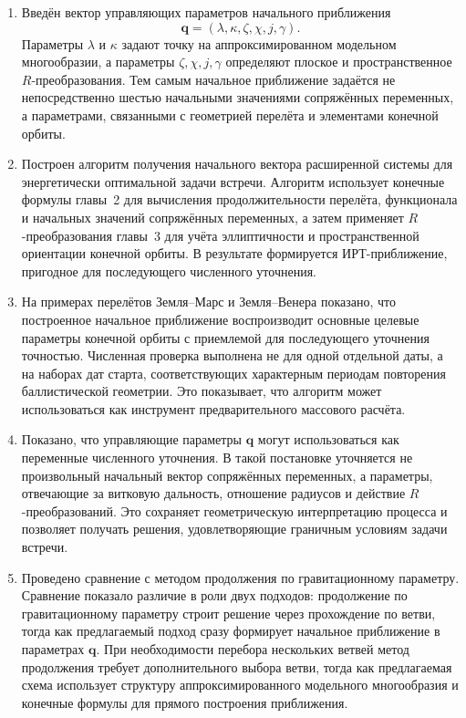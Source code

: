 \begin{enumerate}
	\item Введён вектор управляющих параметров начального приближения
	\begin{equation}
	\mathbf q=(\lambda,\kappa,\zeta,\chi,j,\gamma).
	\end{equation}
	Параметры \(\lambda\) и \(\kappa\) задают точку на аппроксимированном модельном многообразии, а параметры \(\zeta,\chi,j,\gamma\) определяют плоское и пространственное \(R\)-преобразования. Тем самым начальное приближение задаётся не непосредственно шестью начальными значениями сопряжённых переменных, а параметрами, связанными с геометрией перелёта и элементами конечной орбиты.

	\item Построен алгоритм получения начального вектора расширенной системы для энергетически оптимальной задачи встречи. Алгоритм использует конечные формулы главы~2 для вычисления продолжительности перелёта, функционала и начальных значений сопряжённых переменных, а затем применяет \(R\)-преобразования главы~3 для учёта эллиптичности и пространственной ориентации конечной орбиты. В результате формируется ИРТ-приближение, пригодное для последующего численного уточнения.

	\item На примерах перелётов Земля--Марс и Земля--Венера показано, что построенное начальное приближение воспроизводит основные целевые параметры конечной орбиты с приемлемой для последующего уточнения точностью. Численная проверка выполнена не для одной отдельной даты, а на наборах дат старта, соответствующих характерным периодам повторения баллистической геометрии. Это показывает, что алгоритм может использоваться как инструмент предварительного массового расчёта.

	\item Показано, что управляющие параметры \(\mathbf q\) могут использоваться как переменные численного уточнения. В такой постановке уточняется не произвольный начальный вектор сопряжённых переменных, а параметры, отвечающие за витковую дальность, отношение радиусов и действие \(R\)-преобразований. Это сохраняет геометрическую интерпретацию процесса и позволяет получать решения, удовлетворяющие граничным условиям задачи встречи.

	\item Проведено сравнение с методом продолжения по гравитационному параметру. Сравнение показало различие в роли двух подходов: продолжение по гравитационному параметру строит решение через прохождение по ветви, тогда как предлагаемый подход сразу формирует начальное приближение в параметрах \(\mathbf q\). При необходимости перебора нескольких ветвей метод продолжения требует дополнительного выбора ветви, тогда как предлагаемая схема использует структуру аппроксимированного модельного многообразия и конечные формулы для прямого построения приближения.


\end{enumerate}
